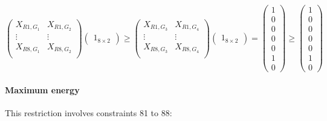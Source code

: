 \begin{equation}
    \begin{pmatrix}
        X_{R1,G_1} & X_{R1,G_2}\\
        \vdots & \vdots\\
        X_{R8,G_1} & X_{R8,G_2}\\
    \end{pmatrix}
    \begin{pmatrix}
        1_{8 \times 2}
    \end{pmatrix}
    \geq
    \begin{pmatrix}
        X_{R1,G_3} & X_{R1,G_4}\\
        \vdots & \vdots\\
        X_{R8,G_3} & X_{R8,G_4}\\
    \end{pmatrix}
    \begin{pmatrix}
        1_{8 \times 2}
    \end{pmatrix}
    =
    \begin{pmatrix}
        1\\
        0\\
        0\\
        0\\
        0\\
        1\\
        0
    \end{pmatrix}
    \geq
    \begin{pmatrix}
        1\\
        0\\
        0\\
        0\\
        0\\
        1\\
        0
    \end{pmatrix}
\end{equation}

\paragraph{Maximum energy}
This restriction involves constraints 81 to 88:

